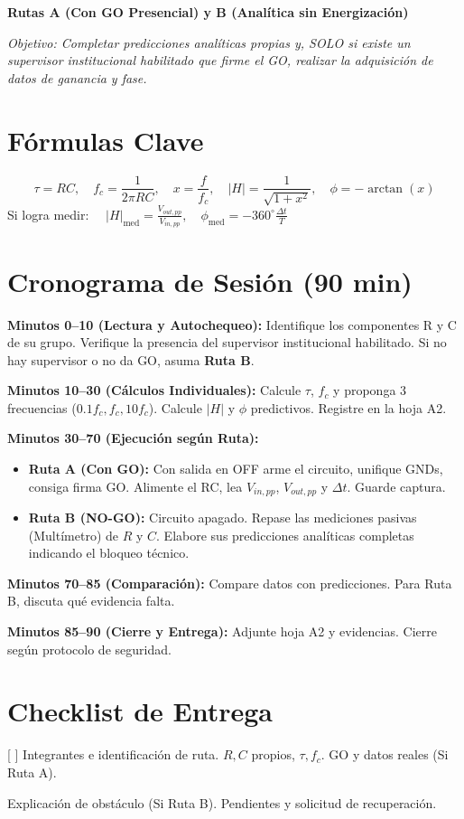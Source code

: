 \documentclass[11pt, a4paper]{article}
\begin{document}
\begin{tcolorbox}[colback=ucbblue!5!white, colframe=ucbblue, title=\textbf{Artefacto A5a: Guía Autónoma de Trabajo (W16S2 — 18/11/2026)}]
    \centering \textbf{Rutas A (Con GO Presencial) y B (Analítica sin Energización)}
\end{tcolorbox}

\noindent\textit{Objetivo: Completar predicciones analíticas propias y, SOLO si existe un supervisor institucional habilitado que firme el GO, realizar la adquisición de datos de ganancia y fase.}

\section*{Fórmulas Clave}
$$ \tau=RC, \quad f_c=\frac{1}{2\pi RC}, \quad x=\frac{f}{f_c}, \quad |H|=\frac{1}{\sqrt{1+x^2}}, \quad \phi=-\arctan(x) $$
Si logra medir: $\quad |H|_{\text{med}} = \frac{V_{out,pp}}{V_{in,pp}}, \quad \phi_{\text{med}} = -360^\circ \frac{\Delta t}{T}$

\section*{Cronograma de Sesión (90 min)}
\textbf{Minutos 0–10 (Lectura y Autochequeo):} Identifique los componentes R y C de su grupo. Verifique la presencia del supervisor institucional habilitado. Si no hay supervisor o no da GO, asuma \textbf{Ruta B}. \par
\textbf{Minutos 10–30 (Cálculos Individuales):} Calcule $\tau$, $f_c$ y proponga 3 frecuencias ($0.1f_c, f_c, 10f_c$). Calcule $|H|$ y $\phi$ predictivos. Registre en la hoja A2. \par
\textbf{Minutos 30–70 (Ejecución según Ruta):}
\begin{itemize}
    \item \textbf{Ruta A (Con GO):} Con salida en OFF arme el circuito, unifique GNDs, consiga firma GO. Alimente el RC, lea $V_{in,pp}$, $V_{out,pp}$ y $\Delta t$. Guarde captura.
    \item \textbf{Ruta B (NO-GO):} Circuito apagado. Repase las mediciones pasivas (Multímetro) de $R$ y $C$. Elabore sus predicciones analíticas completas indicando el bloqueo técnico.
\end{itemize}
\textbf{Minutos 70–85 (Comparación):} Compare datos con predicciones. Para Ruta B, discuta qué evidencia falta. \par
\textbf{Minutos 85–90 (Cierre y Entrega):} Adjunte hoja A2 y evidencias. Cierre según protocolo de seguridad.

\section*{Checklist de Entrega}
[ ] Integrantes e identificación de ruta. \quad [ ] $R, C$ propios, $\tau, f_c$. \quad [ ] GO y datos reales (Si Ruta A). \par
[ ] Explicación de obstáculo (Si Ruta B). \quad [ ] Pendientes y solicitud de recuperación.
\end{document}
